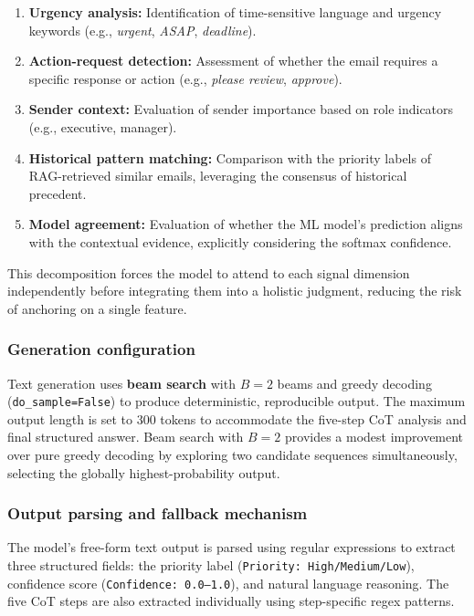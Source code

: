 \documentclass[3p,times,procedia]{elsarticle}
\begin{document}
\begin{enumerate}
\item \textbf{Urgency analysis:} Identification of time-sensitive language and urgency keywords (e.g., \textit{urgent}, \textit{ASAP}, \textit{deadline}).
\item \textbf{Action-request detection:} Assessment of whether the email requires a specific response or action (e.g., \textit{please review}, \textit{approve}).
\item \textbf{Sender context:} Evaluation of sender importance based on role indicators (e.g., executive, manager).
\item \textbf{Historical pattern matching:} Comparison with the priority labels of RAG-retrieved similar emails, leveraging the consensus of historical precedent.
\item \textbf{Model agreement:} Evaluation of whether the ML model's prediction aligns with the contextual evidence, explicitly considering the softmax confidence.
\end{enumerate}

This decomposition forces the model to attend to each signal dimension independently before integrating them into a holistic judgment, reducing the risk of anchoring on a single feature.

\subsubsection{Generation configuration}

Text generation uses \textbf{beam search} with $B = 2$ beams and greedy decoding (\texttt{do\_sample=False}) to produce deterministic, reproducible output. The maximum output length is set to 300 tokens to accommodate the five-step CoT analysis and final structured answer. Beam search with $B = 2$ provides a modest improvement over pure greedy decoding by exploring two candidate sequences simultaneously, selecting the globally highest-probability output.

\subsubsection{Output parsing and fallback mechanism}

The model's free-form text output is parsed using regular expressions to extract three structured fields: the priority label (\texttt{Priority: High/Medium/Low}), confidence score (\texttt{Confidence: 0.0--1.0}), and natural language reasoning. The five CoT steps are also extracted individually using step-specific regex patterns.
\end{document}
